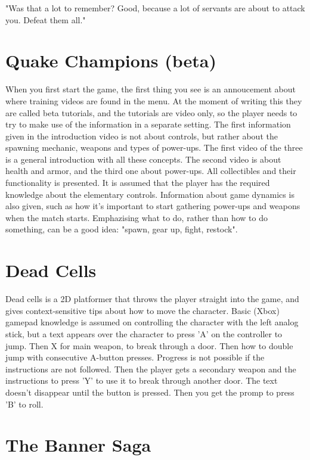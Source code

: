 "Was that a lot to remember?
Good, because a lot of servants are about to attack you.
Defeat them all."

\section{Quake Champions (beta)}

When you first start the game, the first thing you see is an annoucement about
where training videos are found in the menu. At the moment of writing this
they are called beta tutorials, and the tutorials are video only, so the
player needs to try to make use of the information in a separate setting. The
first information given in the introduction video is not about controls, but
rather about the spawning mechanic, weapons and types of power-ups. The first
video of the three is a general introduction with all these concepts. The
second video is about health and armor, and the third one about power-ups.
All collectibles and their functionality is presented. It is assumed that the
player has the required knowledge about the elementary controls. Information about game dynamics is also given, such as how it's important to start gathering power-ups and weapons when the match starts. Emphazising what to do, rather than how to do something, can be a good idea: "spawn, gear up, fight, restock".

\section{Dead Cells}

Dead cells is a 2D platformer that throws the player straight into the game, and gives context-sensitive tips about how to move the character. Basic (Xbox) gamepad knowledge is assumed on controlling the character with the left analog stick, but a text appears over the character to press 'A' on the controller to jump. Then X for main weapon, to break through a door. Then how to double jump with consecutive A-button presses. Progress is not possible if the instructions are not followed. Then the player gets a secondary weapon and the instructions to press 'Y' to use it to break through another door. The text doesn't disappear until the button is pressed. Then you get the promp to press 'B' to roll.

\section{The Banner Saga}


